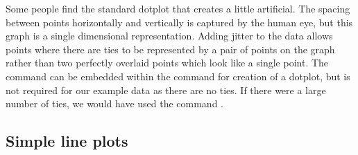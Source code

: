 Some people find the standard dotplot that \R{} creates a little artificial. The spacing between points horizontally and vertically is captured by the human eye, but this graph is a single dimensional representation. Adding jitter to the data allows points where there are ties to be represented by a pair of points on the graph rather than two perfectly overlaid points which look like a single point. The  command can be embedded within the command for creation of a dotplot, but is not required for our example data as there are no ties. If there were a large number of ties, we would have used the command . 
 
 
 
\subsection{Simple line plots} 
 
